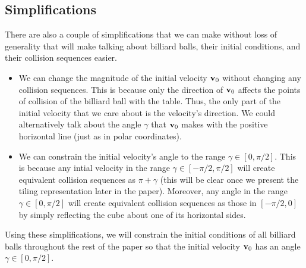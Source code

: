 \subsection{Simplifications}

There are also a couple of simplifications that we can make without loss of generality that will make talking about billiard balls, their initial conditions, and their collision sequences easier.

\begin{itemize}
  \item We can change the magnitude of the initial velocity $\mathbf{v}_0$ without changing any collision sequences. This is because only the direction of $\mathbf{v}_0$ affects the points of collision of the billiard ball with the table. Thus, the only part of the initial velocity that we care about is the velocity's direction. We could alternatively talk about the angle $\gamma$ that $\mathbf{v}_0$ makes with the positive horizontal line (just as in polar coordinates).
  \item We can constrain the initial velocity's angle to the range $\gamma \in [0, \pi/2]$. This is because any intial velocity in the range $\gamma \in [-\pi/2, \pi/2]$ will create equivalent collision sequences as $\pi + \gamma$ (this will be clear once we present the tiling representation later in the paper). Moreover, any angle in the range $\gamma \in [0, \pi/2]$ will create equivalent collision sequences as those in $[-\pi/2, 0]$ by simply reflecting the cube about one of its horizontal sides.
\end{itemize}

Using these simplifications, we will constrain the initial conditions of all billiard balls throughout the rest of the paper so that the initial velocity $\mathbf{v}_0$ has an angle $\gamma \in [0, \pi/2]$.
